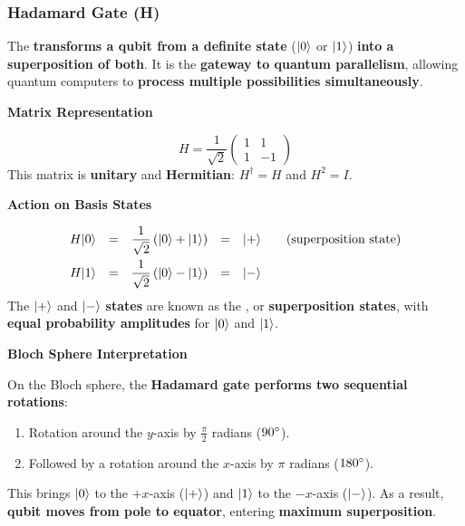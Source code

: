 \subsubsection{Hadamard Gate (H)}\label{subsubsection: Hadamard Gate H}

The  \textbf{transforms a qubit from a definite state} ($| 0 \rangle$ or $| 1 \rangle$) \textbf{into a superposition of both}. It is the \textbf{gateway to quantum parallelism}, allowing quantum computers to \textbf{process multiple possibilities simultaneously}.

\highspace
\begin{flushleft}
    \textcolor{Green3}{ \textbf{Matrix Representation}}
\end{flushleft}
\begin{equation}
    H = \dfrac{1}{\sqrt{2}} 
    \begin{pmatrix}
        1 & 1 \\ 1 & -1
    \end{pmatrix}
\end{equation}
This matrix is \textbf{unitary} and \textbf{Hermitian}: $H^{\dagger} = H$ and $H^{2} = I$.

\highspace
\begin{flushleft}
    \textcolor{Green3}{ \textbf{Action on Basis States}}
\end{flushleft}
\begin{equation*}
    \begin{array}{rclcl}
        H | 0 \rangle &=& \dfrac{1}{\sqrt{2}}\left(| 0 \rangle + | 1 \rangle\right) &=& | + \rangle \hspace{2em} \text{(superposition state)} \\ [1em]
        H | 1 \rangle &=& \dfrac{1}{\sqrt{2}}\left(| 0 \rangle - | 1 \rangle\right) &=& | - \rangle
    \end{array}
\end{equation*}
The $| + \rangle$ and $| - \rangle$ \textbf{states} are known as the , or \textbf{superposition states}, with \textbf{equal probability amplitudes} for $| 0 \rangle$ and $| 1 \rangle$.

\highspace
\begin{flushleft}
    \textcolor{Green3}{ \textbf{Bloch Sphere Interpretation}}
\end{flushleft}
On the Bloch sphere, the \textbf{Hadamard gate performs two sequential rotations}:
\begin{enumerate}
    \item Rotation around the $y$-axis by $\frac{\pi}{2}$ radians ($90\degree$).
    \item Followed by a rotation around the $x$-axis by $\pi$ radians ($180\degree$).
\end{enumerate}
This brings $| 0 \rangle$ to the $+x$-axis ($| + \rangle$) and $| 1 \rangle$ to the $-x$-axis ($| - \rangle$). As a result, \textbf{qubit moves from pole to equator}, entering \textbf{maximum superposition}.

